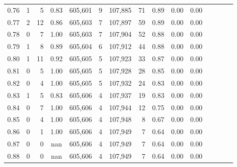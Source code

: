 \begin{tabular}{rrrcrrrrrrrrrrr}
0.76 &       1 &      5 &                                       0.83 &  605,601 &        9 &  107,885 &       71 &  0.89 &  0.00 &                         0.00 \\
0.77 &       2 &     12 &                                       0.86 &  605,603 &        7 &  107,897 &       59 &  0.89 &  0.00 &                         0.00 \\
0.78 &       0 &      7 &                                       1.00 &  605,603 &        7 &  107,904 &       52 &  0.88 &  0.00 &                         0.00 \\
0.79 &       1 &      8 &                                       0.89 &  605,604 &        6 &  107,912 &       44 &  0.88 &  0.00 &                         0.00 \\
0.80 &       1 &     11 &                                       0.92 &  605,605 &        5 &  107,923 &       33 &  0.87 &  0.00 &                         0.00 \\
0.81 &       0 &      5 &                                       1.00 &  605,605 &        5 &  107,928 &       28 &  0.85 &  0.00 &                         0.00 \\
0.82 &       0 &      4 &                                       1.00 &  605,605 &        5 &  107,932 &       24 &  0.83 &  0.00 &                         0.00 \\
0.83 &       1 &      5 &                                       0.83 &  605,606 &        4 &  107,937 &       19 &  0.83 &  0.00 &                         0.00 \\
0.84 &       0 &      7 &                                       1.00 &  605,606 &        4 &  107,944 &       12 &  0.75 &  0.00 &                         0.00 \\
0.85 &       0 &      4 &                                       1.00 &  605,606 &        4 &  107,948 &        8 &  0.67 &  0.00 &                         0.00 \\
0.86 &       0 &      1 &                                       1.00 &  605,606 &        4 &  107,949 &        7 &  0.64 &  0.00 &                         0.00 \\
0.87 &       0 &      0 &                                        nan &  605,606 &        4 &  107,949 &        7 &  0.64 &  0.00 &                         0.00 \\
0.88 &       0 &      0 &                                        nan &  605,606 &        4 &  107,949 &        7 &  0.64 &  0.00 &                         0.00 \\

\end{tabular}
